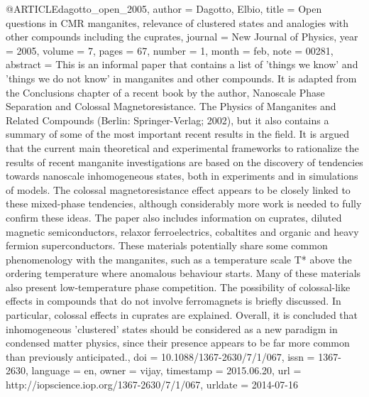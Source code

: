 @ARTICLE{dagotto_open_2005,
  author = {Dagotto, Elbio},
  title = {Open questions in {CMR} manganites, relevance of clustered states
	and analogies with other compounds including the cuprates},
  journal = {New Journal of Physics},
  year = {2005},
  volume = {7},
  pages = {67},
  number = {1},
  month = feb,
  note = {00281},
  abstract = {This is an informal paper that contains a list of 'things we know'
	and 'things we do not know' in manganites and other compounds. It
	is adapted from the Conclusions chapter of a recent book by the author,
	Nanoscale Phase Separation and Colossal Magnetoresistance. The Physics
	of Manganites and Related Compounds (Berlin: Springer-Verlag; 2002),
	but it also contains a summary of some of the most important recent
	results in the field. It is argued that the current main theoretical
	and experimental frameworks to rationalize the results of recent
	manganite investigations are based on the discovery of tendencies
	towards nanoscale inhomogeneous states, both in experiments and in
	simulations of models. The colossal magnetoresistance effect appears
	to be closely linked to these mixed-phase tendencies, although considerably
	more work is needed to fully confirm these ideas. The paper also
	includes information on cuprates, diluted magnetic semiconductors,
	relaxor ferroelectrics, cobaltites and organic and heavy fermion
	superconductors. These materials potentially share some common phenomenology
	with the manganites, such as a temperature scale T* above the ordering
	temperature where anomalous behaviour starts. Many of these materials
	also present low-temperature phase competition. The possibility of
	colossal-like effects in compounds that do not involve ferromagnets
	is briefly discussed. In particular, colossal effects in cuprates
	are explained. Overall, it is concluded that inhomogeneous 'clustered'
	states should be considered as a new paradigm in condensed matter
	physics, since their presence appears to be far more common than
	previously anticipated.},
  doi = {10.1088/1367-2630/7/1/067},
  issn = {1367-2630},
  language = {en},
  owner = {vijay},
  timestamp = {2015.06.20},
  url = {http://iopscience.iop.org/1367-2630/7/1/067},
  urldate = {2014-07-16}
}

